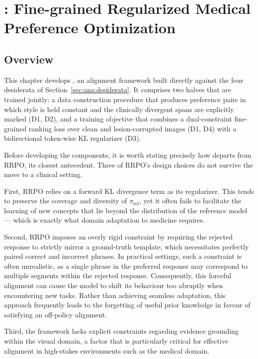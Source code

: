\section{\ourloss{}: Fine-grained Regularized Medical Preference Optimization}
\label{section:method}

\subsection{Overview}
\label{sec:met:overview}

This chapter develops \ourloss{}, an alignment framework built directly against the four desiderata of Section~\ref{sec:ana:desiderata}. It comprises two halves that are trained jointly: a data construction procedure that produces preference pairs in which style is held constant and the clinically divergent spans are explicitly marked (D1, D2), and a training objective that combines a dual-constraint fine-grained ranking loss over clean and lesion-corrupted images (D1, D4) with a bidirectional token-wise KL regularizer (D3).

Before developing the components, it is worth stating precisely how \ourloss{} departs from RRPO, its closest antecedent. Three of RRPO's design choices do not survive the move to a clinical setting.

First, RRPO relies on a forward KL divergence term as its regularizer. This tends to preserve the coverage and diversity of $\pi_{\text{ref}}$, yet it often fails to facilitate the learning of new concepts that lie beyond the distribution of the reference model --- which is exactly what domain adaptation to medicine requires.

Second, RRPO imposes an overly rigid constraint by requiring the rejected response to strictly mirror a ground-truth template, which necessitates perfectly paired correct and incorrect phrases. In practical settings, such a constraint is often unrealistic, as a single phrase in the preferred response may correspond to multiple segments within the rejected response. Consequently, this forceful alignment can cause the model to shift its behaviour too abruptly when encountering new tasks. Rather than achieving seamless adaptation, this approach frequently leads to the forgetting of useful prior knowledge in favour of satisfying an off-policy alignment.

Third, the framework lacks explicit constraints regarding evidence grounding within the visual domain, a factor that is particularly critical for effective alignment in high-stakes environments such as the medical domain.

